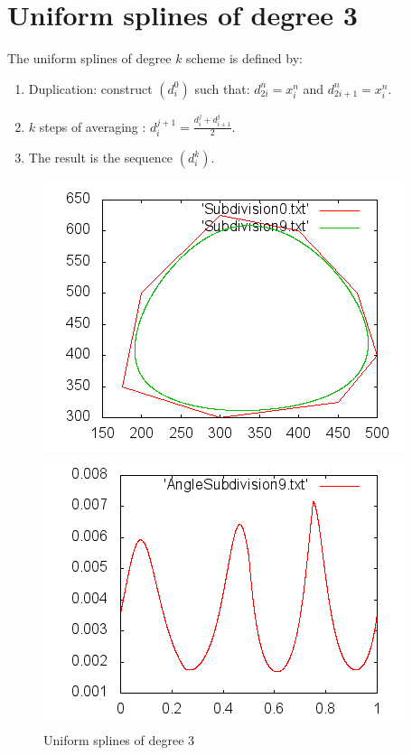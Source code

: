 \documentclass[a4paper,11pt]{article}
\begin{document}
\section{Uniform splines of degree 3}

The uniform splines of degree $ k $ scheme is defined by:
\begin{enumerate}
    \item Duplication: construct $ (d_i^0) $ such that: $ d_{2i}^n = x_i^n $ and
        $ d_{2i+1}^n = x_i^n $.
    \item $ k $ steps of averaging : $ d_i^{j+1} = \frac{d_i^j +d_{i+1}^j}{2} $.
    \item The result is the sequence $ (d_i^k) $.
\end{enumerate}

\begin{figure}[H]
\centering
\begin{minipage}{0.35\paperwidth}
\includegraphics[scale=0.75]{pic/poly4.png}
\end{minipage}
\begin{minipage}{0.35\paperwidth}
\includegraphics[scale=0.75]{pic/angle4.png}
\end{minipage}
\caption{Uniform splines of degree 3}
\end{figure}
\end{document}
